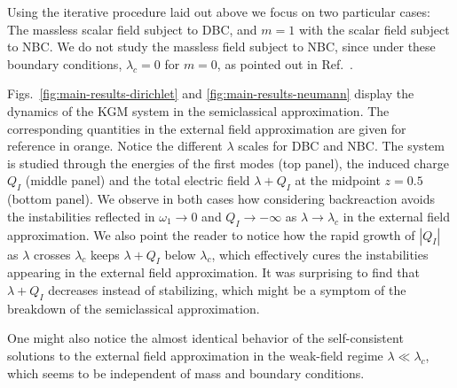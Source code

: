 
Using the iterative procedure laid out above we focus on two particular cases: The massless scalar field subject to DBC, and  $m=1$ with
the scalar field subject to NBC. We do not study the massless field subject to NBC, since under these boundary conditions, $\lambda_c=0$ for $m=0$, as pointed out in Ref.~\cite{wernersson_vacuum_2021}.

Figs.~\ref{fig:main-results-dirichlet} and \ref{fig:main-results-neumann}  display the dynamics of the KGM system in the semiclassical approximation. The corresponding quantities in the external field approximation are given for reference in orange. Notice the different $\lambda$ scales for DBC and NBC. The system is studied through the energies of the first modes (top panel), the induced charge $Q_I$ (middle panel) and the total electric field $\lambda+Q_I$ at the midpoint $z=0.5$ (bottom panel). We observe in both cases how considering backreaction avoids the instabilities reflected in $\omega_1 \to 0$ and $Q_I\to-\infty$ as $\lambda \to \lambda_c$ in the external field approximation. We also point the reader to notice how the rapid growth of $|Q_I|$ as $\lambda$ crosses $\lambda_c$ keeps $\lambda + Q_I$ below $\lambda_c$, which effectively cures the instabilities appearing in the external field approximation. It was surprising to find that $\lambda+Q_I$ decreases instead of stabilizing, which might be a symptom of the breakdown of the semiclassical approximation.

One might also notice the almost identical behavior of the self-consistent solutions to the
external field approximation in the weak-field regime $\lambda \ll {\lambda_c}$, which seems to be independent of mass and boundary conditions.




